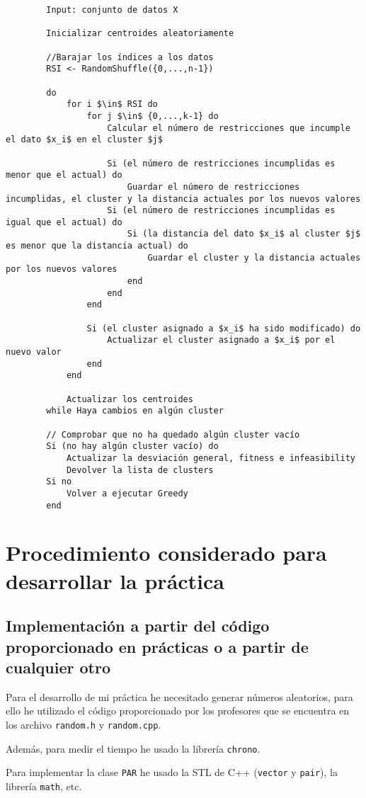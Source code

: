 		\footnotesize
		\begin{lstlisting}
		Input: conjunto de datos X

		Inicializar centroides aleatoriamente
		
		//Barajar los índices a los datos 
		RSI <- RandomShuffle({0,...,n-1})

		do 
			for i $\in$ RSI do 
				for j $\in$ {0,...,k-1} do 
					Calcular el número de restricciones que incumple el dato $x_i$ en el cluster $j$

					Si (el número de restricciones incumplidas es menor que el actual) do
						Guardar el número de restricciones incumplidas, el cluster y la distancia actuales por los nuevos valores
					Si (el número de restricciones incumplidas es igual que el actual) do 
						Si (la distancia del dato $x_i$ al cluster $j$ es menor que la distancia actual) do 
							Guardar el cluster y la distancia actuales por los nuevos valores
						end
					end
				end 

				Si (el cluster asignado a $x_i$ ha sido modificado) do 
					Actualizar el cluster asignado a $x_i$ por el nuevo valor
				end
			end

			Actualizar los centroides
		while Haya cambios en algún cluster

		// Comprobar que no ha quedado algún cluster vacío
		Si (no hay algún cluster vacío) do 
			Actualizar la desviación general, fitness e infeasibility
			Devolver la lista de clusters
		Si no
			Volver a ejecutar Greedy 
		end
		\end{lstlisting}
		\normalsize
\newpage

\section{Procedimiento considerado para desarrollar la práctica}
	\subsection{Implementación a partir del código proporcionado en prácticas o a partir de cualquier otro}
	Para el desarrollo de mi práctica he necesitado generar números aleatorios, para ello he utilizado el código 
	proporcionado por los profesores que se encuentra en los archivo \lstinline!random.h! y \lstinline!random.cpp!.
	
	Además, para medir el tiempo he usado la librería \lstinline!chrono!.

	Para implementar la clase \lstinline!PAR! he usado la STL de C++ (\lstinline!vector! y \lstinline!pair!), la librería \lstinline!math!, etc.

